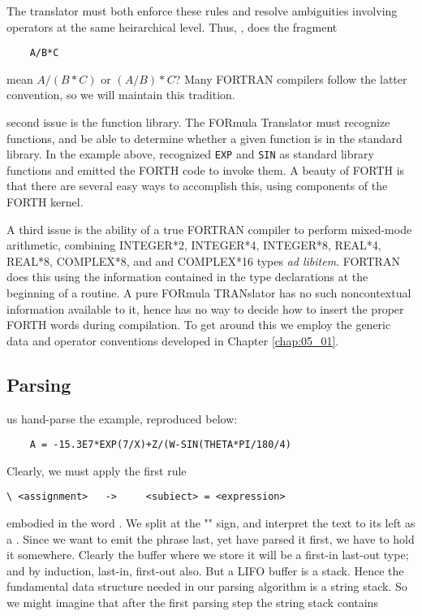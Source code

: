 The translator must both enforce these rules and resolve ambiguities involving operators at the same heirarchical level. Thus, \eg, does the fragment

\begin{lstlisting}
    A/B*C
\end{lstlisting}

mean $A/(B*C)$ or $(A/B)*C$? Many FORTRAN compilers follow the latter convention, so we will maintain this tradition.

 second issue is the function library. The FORmula Translator must recognize functions, and be able to determine whether a given function is in the standard library. In the example above,  recognized \texttt{EXP} and \texttt{SIN} as standard library functions and emitted the FORTH code to invoke them. A beauty of FORTH is that there are several easy ways to accomplish this, using components of the FORTH kernel.

A third issue is the ability of a true FORTRAN compiler to perform mixed-mode arithmetic, combining INTEGER*2, INTEGER*4, INTEGER*8, REAL*4, REAL*8, COMPLEX*8, and 
and COMPLEX*16 types \textit{ad libitem}. FORTRAN does this using the information contained in the type declarations at the beginning of a routine. A pure FORmula TRANslator has no such noncontextual information available to it, hence has no way to decide how to insert the proper FORTH words during compilation. To get around this we employ the generic data and operator conventions developed in Chapter \ref{chap:05_01}.

\subsection{Parsing}
 us hand-parse the example, reproduced below:

\begin{lstlisting}
    A = -15.3E7*EXP(7/X)+Z/(W-SIN(THETA*PI/180/4)
\end{lstlisting}

Clearly, we must apply the first rule

\begin{verbatim}
\ <assignment>   ->     <subiect> = <expression>
\end{verbatim}

embodied in the word . We split at the "\bc{=}" sign, and interpret the text to its left as a . Since we want to emit the phrase  last, yet have parsed it first, we have to hold it somewhere. Clearly the buffer where we store it will be a first-in last-out type; and by induction, last-in, first-out also. But a LIFO buffer is a stack. Hence the fundamental data structure needed in our parsing algorithm is a string stack. So we might imagine that after the first parsing step the string stack contains

